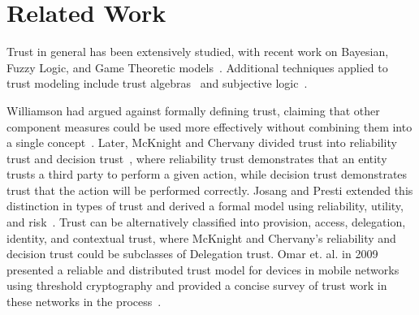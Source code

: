 \documentclass[10pt,conference]{IEEEtran}
\begin{document}
\section{Related Work}
Trust in general has been extensively studied, with recent work on Bayesian, Fuzzy Logic, and Game Theoretic models~\cite{ChSwCh:11,JoIsBo:07,SaSi:05,ShNePa:13,GoMo:12}.  Additional techniques applied to trust modeling include trust algebras~\cite{WeCuBo:09,Jo:99} and subjective logic~\cite{JoHaPo:06,subjective_logic}.

Williamson had argued against formally defining trust, claiming that other component measures could be used more effectively without combining them into a single concept~\cite{Wi:93}.  Later, McKnight and Chervany divided trust into reliability trust and decision trust~\cite{McCh:96}, where reliability trust demonstrates that an entity trusts a third party to perform a given action, while decision trust demonstrates trust that the action will be performed correctly.  Josang and Presti extended this distinction in types of trust and derived a formal model using reliability, utility, and risk~\cite{JoPr:04}.  Trust can be alternatively classified into provision, access, delegation, identity, and contextual trust, where McKnight and Chervany's reliability and decision trust could be subclasses of Delegation trust.  Omar et. al. in 2009 presented a reliable and distributed trust model for devices in mobile networks using threshold cryptography and provided a concise survey of trust work in these networks in the process~\cite{OmChBo:09}.
\end{document}
